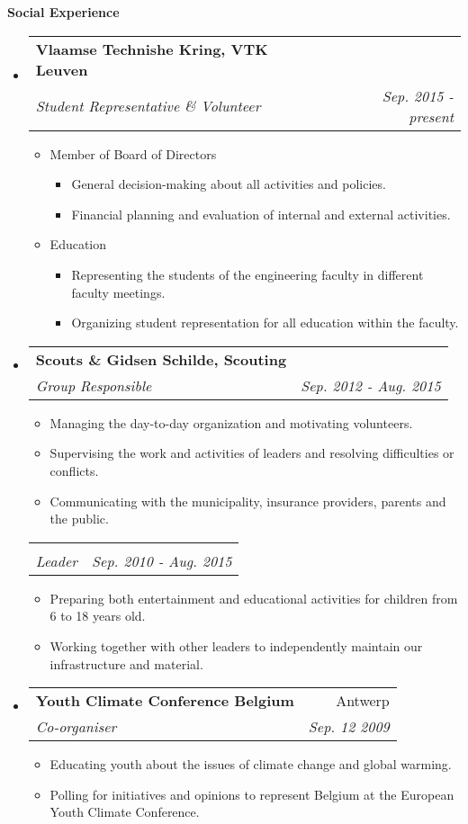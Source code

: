 \documentclass[letterpaper,11pt]{article}
\makeatletter
\newcommand{\resheading}[1]{{\large \colorbox{mygrey}{\begin{minipage}{\textwidth}{\textbf{#1 \vphantom{p\^{E}}}}\end{minipage}}}}
\newcommand{\ressubheading}[4]{
\begin{tabular*}{7.3in}{l@{\extracolsep{\fill}}r}
		\textbf{#1} & #2 \\
		\textit{#3} & \textit{#4} \\
\end{tabular*}\vspace{-6pt}}
\newcommand{\resitem}[1]{\item #1 \vspace{-2pt}}
\newcommand{\noresrepeat}[0]{\vspace{-20pt}}
\makeatother
\begin{document}
\resheading{Social Experience}
\begin{itemize}[leftmargin=*]

\item[]
	\ressubheading{Vlaamse Technishe Kring, VTK Leuven}{ }{Student Representative \& Volunteer}{Sep. 2015 - present}
	\begin{itemize}
		\resitem{Member of Board of Directors}
		\begin{itemize}
			\resitem{General decision-making about all activities and policies.}
			\resitem{Financial planning and evaluation of internal and external activities.}
		\end{itemize}
		\resitem{Education}
		\begin{itemize}
			\resitem{Representing the students of the engineering faculty in different faculty meetings.}
			\resitem{Organizing student representation for all education within the faculty.}
		\end{itemize}
	\end{itemize}

\item[]
	\ressubheading{Scouts \& Gidsen Schilde, Scouting}{ }{Group Responsible}{Sep. 2012 - Aug. 2015}
	\begin{itemize}
			\resitem{Managing the day-to-day organization and motivating volunteers.}
			\resitem{Supervising the work and activities of leaders and resolving difficulties or conflicts.}
			\resitem{Communicating with the municipality, insurance providers, parents and the public.}
	\end{itemize}

	\ressubheading{\noresrepeat}{ }{Leader}{Sep. 2010 - Aug. 2015}
	\begin{itemize}
		\resitem{Preparing both entertainment and educational activities for children from 6 to 18 years old.}
		\resitem{Working together with other leaders to independently maintain our infrastructure and material.}
	\end{itemize}

\item[]
	\ressubheading{Youth Climate Conference Belgium}{Antwerp}{Co-organiser}{Sep. 12 2009}
	\begin{itemize}
		\resitem{Educating youth about the issues of climate change and global warming.}
		\resitem{Polling for initiatives and opinions to represent Belgium at the European Youth Climate Conference.}
	\end{itemize}


\end{itemize}
\end{document}
